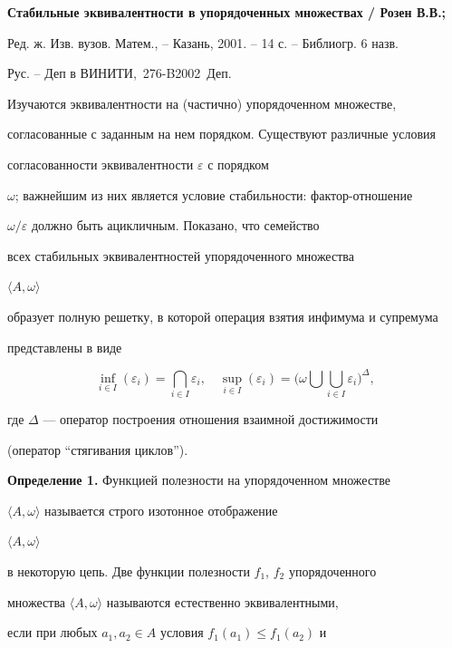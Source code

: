 {\bf Стабильные эквивалентности в упорядоченных множествах / Розен В.В.;


Ред. ж. Изв. вузов. Матем., -- Казань, 2001. -- 14 с. -- Библиогр. 6 назв.


Рус. -- Деп в ВИНИТИ, \No\,276-B2002~Деп.}


\medskip





Изучаются эквивалентности на (частично) упорядоченном множестве,


согласованные с заданным на нем порядком. Существуют различные условия


согласованности эквивалентности $\varepsilon$ с порядком


$\omega$; важнейшим из них является условие стабильности: фактор-отношение


$\omega/\varepsilon$ должно быть ацикличным. Показано, что семейство


всех стабильных эквивалентностей упорядоченного множества


$\langle A,\omega\rangle$


образует полную решетку, в которой операция взятия инфимума и супремума 


представлены в виде


$$


\inf_{i\in I}


(\varepsilon_i)=\bigcap_{i\in I} \varepsilon_i,\quad


\sup_{i\in I}(\varepsilon_i)=\Big(\omega\bigcup


\bigcup_{i\in I} \varepsilon_i\Big)^\Delta,


$$


где $\Delta$ --- оператор построения отношения взаимной достижимости


(оператор ``стягивания циклов'').


\smallskip





{\bf Определение 1.} Функцией полезности на упорядоченном множестве


$\langle A,\omega\rangle$ называется строго изотонное отображение


$\langle A,\omega\rangle$


в некоторую цепь. Две функции полезности $f_1$, $f_2$ упорядоченного


множества $\langle A,\omega\rangle$ называются естественно эквивалентными,


если при любых $a_1,a_2\in A$ условия $f_1(a_1)\le f_1(a_2)$ и


